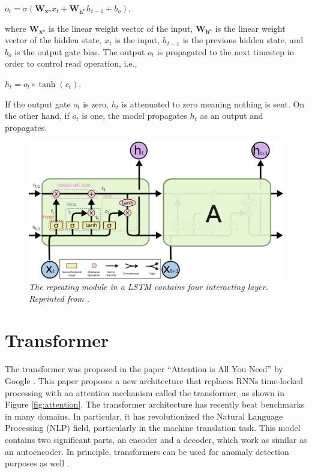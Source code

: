 \hfil $ o_t = \sigma(\mathbf{W_{x^o}}x_t + \mathbf{W_{h^o}}h_{t-1} + b_o) $, \par 

where $\mathbf{W_{x^o}}$ is the linear weight vector of the input, $\mathbf{W_{h^o}}$ is the linear weight vector of the hidden state, $x_t$ is the input, $h_{t-1}$ is the previous hidden state, and $b_o$ is the output gate bias. The output $o_t$ is propagated to the next timestep in order to control read operation, i.e.,

\hfil $ h_t = o_t \circ \tanh(c_t) $. \par 
If the output gate $o_t$ is zero, $h_t$ is attenuated to zero meaning nothing is sent. On the other hand, if $o_t$ is one, the model propagates $h_t$ as an output and propagates.

\begin{figure}[H]
  \centering
  \caption[The repeating module in a LSTM contains four interacting layer.]{\emph{The repeating module in a LSTM contains four interacting layer. \\Reprinted from \citeauthor{olah_2015} \citeyear{olah_2015}.}}\label{fig:LSTM_2}
  \includegraphics[scale = 0.14]{figures/LSTM_2.jpg}  

\end{figure}

\section{Transformer}
\paragraph{}
The transformer was proposed in the paper ``Attention is All You Need'' by Google \cite{vaswani_shazeer_parmar_uszkoreit_jones_n_gomez_kaiser_polosukhin_2017}. This paper proposes a new architecture that replaces RNNs time-locked processing with an attention mechanism called the transformer, as shown in Figure \ref{fig:attention}. The transformer architecture has recently beat benchmarks in many domains. In particular, it has revolutionized the Natural Language Processing (NLP) field, particularly in the machine translation task. This model contains two significant parts, an encoder and a decoder, which work as similar as an autoencoder. In principle, transformers can be used for anomaly detection purposes as well \cite{mishra_verk_fornasier_piciarelli_foresti_2021}.


